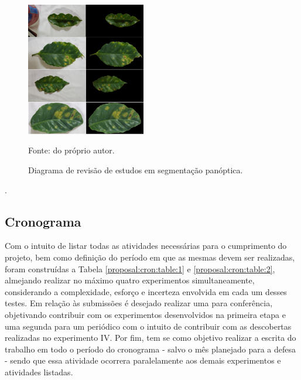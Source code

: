 \begin{figure}[H]
    \centering
    \caption{Diagrama de revisão de estudos em segmentação panóptica.}
    \includegraphics[height=2.3in]{recursos/imagens/introduction/grabcut.png}
    \label{proposal:revision:fig:2}

    \vspace*{1 cm}
    Fonte: do próprio autor.
\end{figure}
.

\subsection{Cronograma}
\label{proposal:cron}

Com o intuito de listar todas as atividades necessárias para o cumprimento do projeto, bem como definição do período em que as mesmas devem ser realizadas, foram construídas a Tabela \ref{proposal:cron:table:1} e \ref{proposal:cron:table:2}, almejando realizar no máximo quatro  experimentos simultaneamente, considerando a complexidade, esforço e incerteza envolvida em cada um desses testes. Em relação às submissões é desejado realizar uma para conferência, objetivando  contribuir com os experimentos desenvolvidos na primeira etapa e uma segunda para um periódico com o intuito de contribuir com as descobertas realizadas no experimento IV. Por fim, tem se como objetivo realizar a escrita do trabalho em todo o período do cronograma - salvo o mês planejado para a defesa - sendo que essa atividade ocorrera paralelamente aos demais experimentos e atividades listadas.


